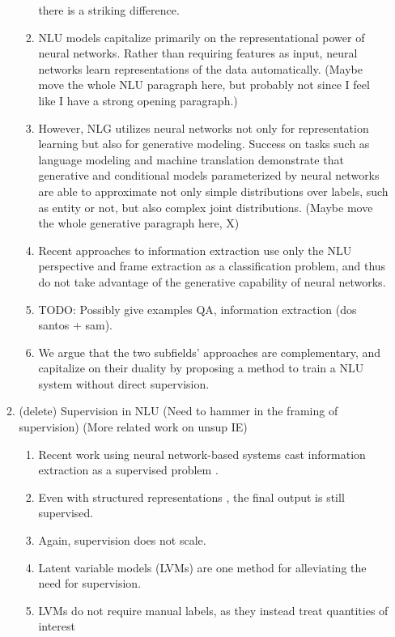 \documentclass[11pt]{article}
\begin{document}
\begin{enumerate}
\begin{enumerate}
\begin{enumerate}
            there is a striking difference.
        \item NLU models capitalize primarily on the representational power of neural networks.
            Rather than requiring features as input, neural networks learn representations of
            the data automatically.
            (Maybe move the whole NLU paragraph here, but probably not since I feel like I have a strong opening paragraph.)
        \item However, NLG utilizes neural networks not only for representation learning
            but also for generative modeling.
            Success on tasks such as language modeling and machine translation
            demonstrate that generative and conditional models parameterized by
            neural networks are able to approximate not only simple distributions over labels,
            such as entity or not,
            but also complex joint distributions. (Maybe move the whole generative paragraph here, X)
        \item Recent approaches to information extraction use only the NLU perspective
            and frame extraction as a classification problem, and thus do not take advantage of
            the generative capability of neural networks.
        \item TODO: Possibly give examples QA, information extraction (dos santos + sam).
        \item We argue that the two subfields' approaches are complementary,
            and capitalize on their duality by proposing a method to train a NLU system
            without direct supervision.
        \end{enumerate}
    \item (delete) Supervision in NLU
        (Need to hammer in the framing of supervision)
        (More related work on unsup IE)
        \begin{enumerate}
        \item Recent work using neural network-based systems cast information extraction
        as a supervised problem
        \citep{wiseman2017d2t,dossantos2015classification}.
        \item Even with structured representations \citep{weissenborn17}, the final output is still supervised.
        \item Again, supervision does not scale.
        \item Latent variable models (LVMs) are one method for alleviating the need for supervision.
        \item LVMs do not require manual labels, as they instead treat quantities of interest

\end{enumerate}
\end{enumerate}
\end{enumerate}
\end{document}
